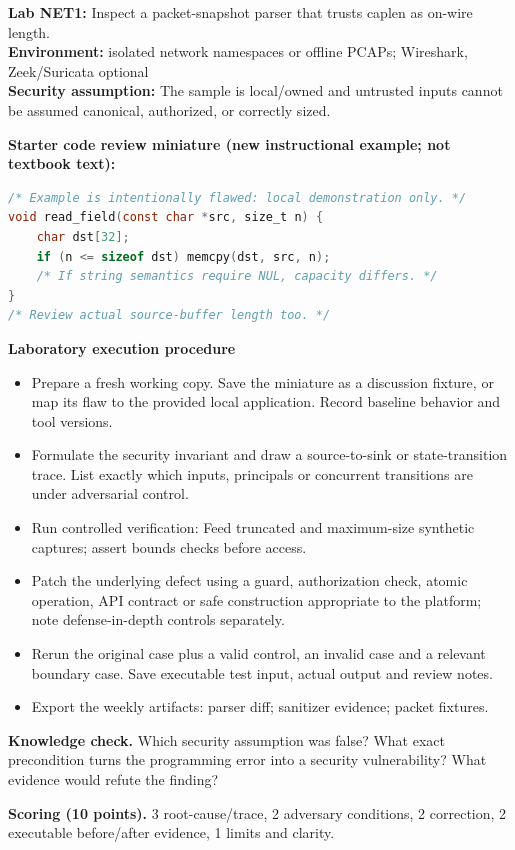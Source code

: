\documentclass[10pt,letterpaper]{article}
\begin{document}
\begin{insight}\textbf{Lab NET1:} Inspect a packet-snapshot parser that trusts caplen as on-wire length.\\\textbf{Environment:} isolated network namespaces or offline PCAPs; Wireshark, Zeek/Suricata optional\\\textbf{Security assumption:} The sample is local/owned and untrusted inputs cannot be assumed canonical, authorized, or correctly sized.\end{insight}
\textbf{Starter code review miniature (new instructional example; not textbook text):}
\begin{lstlisting}[language=C]
/* Example is intentionally flawed: local demonstration only. */
void read_field(const char *src, size_t n) {
    char dst[32];
    if (n <= sizeof dst) memcpy(dst, src, n);
    /* If string semantics require NUL, capacity differs. */
}
/* Review actual source-buffer length too. */
\end{lstlisting}
\textbf{Laboratory execution procedure}
\begin{itemize}[leftmargin=*,itemsep=2pt]
\item Prepare a fresh working copy. Save the miniature as a discussion fixture, or map its flaw to the provided local application. Record baseline behavior and tool versions.
\item Formulate the security invariant and draw a source-to-sink or state-transition trace. List exactly which inputs, principals or concurrent transitions are under adversarial control.
\item Run controlled verification: Feed truncated and maximum-size synthetic captures; assert bounds checks before access.
\item Patch the underlying defect using a guard, authorization check, atomic operation, API contract or safe construction appropriate to the platform; note defense-in-depth controls separately.
\item Rerun the original case plus a valid control, an invalid case and a relevant boundary case. Save executable test input, actual output and review notes.
\item Export the weekly artifacts: parser diff; sanitizer evidence; packet fixtures.
\end{itemize}
\textbf{Knowledge check.} Which security assumption was false? What exact precondition turns the programming error into a security vulnerability? What evidence would refute the finding?

\textbf{Scoring (10 points).} 3 root-cause/trace, 2 adversary conditions, 2 correction, 2 executable before/after evidence, 1 limits and clarity.
\end{document}

